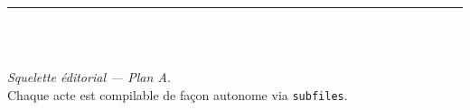 \documentclass[../main.tex]{subfiles}
\begin{document}
\thispagestyle{empty}
\begin{center}
  {\Large \textbf{\BookTitle}}\\[0.3em]
  {\small \BookSubtitle}\\[1.2em]
  \rule{0.6\linewidth}{0.6pt}\\[1.2em]
  {\normalsize \BookAuthor}\\[0.4em]
  {\small \BookDate}
\end{center}
\vfill
\begin{center}
  \emph{Squelette éditorial — Plan A.}\\
  \small{Chaque acte est compilable de façon autonome via \texttt{subfiles}.}
\end{center}
\clearpage
\end{document}
